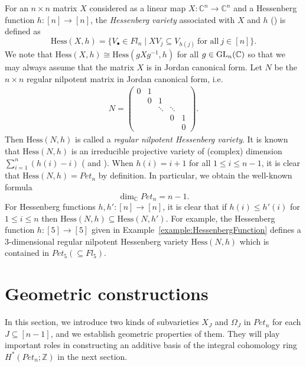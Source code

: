 For an $n\times n$ matrix $X$ considered as a linear map $X\colon{\mathbb C}^n \to {\mathbb C}^n$ and a Hessenberg function $h\colon [n] \to [n]$, the \textit{Hessenberg variety} associated with $X$ and $h$ (\cite{DeMari-Procesi-Shayman,ty}) is defined as
\begin{equation} \label{eq:DefinitionHessenbergVariety}
\text{Hess}(X,h)=\{V_\bullet \in Fl_n \mid XV_j \subseteq V_{h(j)} \ \mbox{for all} \ j\in[n] \}.
\end{equation}
We note that $\text{Hess}(X,h)\cong \text{Hess}(gXg^{-1},h)$ for all $g\in{\rm GL}_n({\mathbb C})$ so that we may always assume that the matrix $X$ is in Jordan canonical form.
Let $N$ be the $n\times n$ regular nilpotent matrix in Jordan canonical form, i.e. 
\begin{align}\label{eq: def of N}
N =
\begin{pmatrix} 
0 & 1 & & &\\ 
& 0 & 1 & &\\
&   & \ddots & \ddots &\\
&  & & 0 & 1\\
&  & & & 0
\end{pmatrix}.
\end{align}
Then $\text{Hess}(N,h)$ is called a \textit{regular nilpotent Hessenberg variety}. It is known that $\text{Hess}(N,h)$ is an irreducible projective variety of (complex) dimension $\sum_{i=1}^n (h(i)-i)$ (\cite[Lemma 7.1]{an-ty} and \cite{ty}). When $h(i)=i+1$ for all $1\le i\le n-1$, it is clear that $\text{Hess}(N,h)=Pet_{n}$ by definition. 
In particular, we obtain the well-known formula 
\[\dim_{{\mathbb C}}Pet_{n}=n-1.\]
For Hessenberg functions $h,h'\colon[n]\rightarrow [n]$, it is clear that if $h(i)\le h'(i)$ for $1\le i\le n$ then $\text{Hess}(N,h)\subseteq \text{Hess}(N,h')$. For example, the Hessenberg function $h\colon[5]\rightarrow[5]$ given in Example~\ref{example:HessenbergFunction} defines a $3$-dimensional regular nilpotent Hessenberg variety $\text{Hess}(N,h)$ which is contained in $Pet_{5}(\subseteq Fl_5)$. 

\section{Geometric constructions}\label{sec: geometric constructions}
In this section, we introduce two kinds of subvarieties $X_J$ and $\Omega_J$ in $Pet_{n}$ for each $J\subseteq[n-1]$, and we establish geometric properties of them. They will play important roles in constructing an additive basis of the integral cohomology ring $H^*(Pet_{n};{\mathbb Z})$ in the next section.

